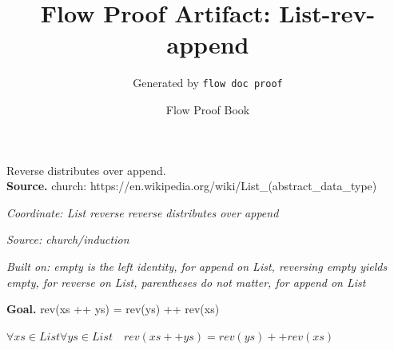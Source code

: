 \documentclass[11pt]{article}
\title{Flow Proof Artifact: List-rev-append}
\author{Generated by \texttt{flow doc proof}}
\date{Flow Proof Book}
\theoremstyle{definition}
\begin{document}
\maketitle
Reverse distributes over append.\\[0.5em]
\textbf{Source.} church: https://en.wikipedia.org/wiki/List\_(abstract\_data\_type)\\[0.5em]
\bigskip
{}\par
\smallskip\noindent\textit{Coordinate: List \cdot reverse \cdot reverse distributes over append}\par
\smallskip\noindent\textit{Source: church/induction}\par
\smallskip\noindent\textit{Built on: empty is the left identity, for append on List, reversing empty yields empty, for reverse on List, parentheses do not matter, for append on List}\par
\medskip
\noindent\textbf{Goal.} rev(xs ++ ys) = rev(ys) ++ rev(xs)\par
\noindent$\displaystyle \forall xs \in List \forall ys \in List\quad rev(xs ++ ys) = rev(ys) ++ rev(xs)$\par
\medskip
\noindent
\end{document}
